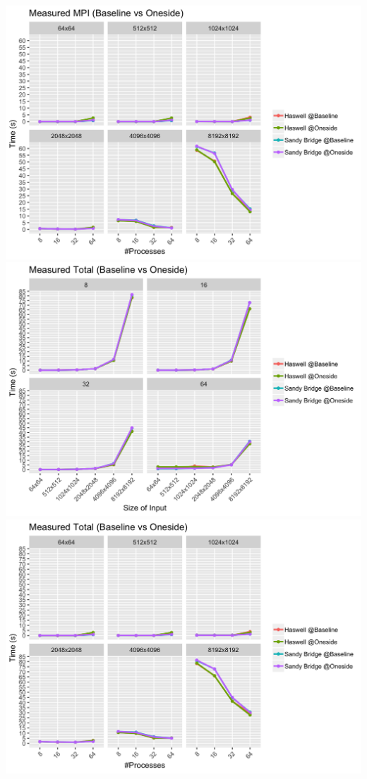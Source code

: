 \documentclass[10pt, letterpaper, twoside]{article}
\begin{document}
\begin{titlepage}
\begin{enumerate}
\includegraphics[scale = 0.18]{OSBaseline_Measured-MPI_InputSize.png}
\vspace{10mm}
\includegraphics[scale = 0.18]{OSBaseline_Measured-Total_Processes.png}
\includegraphics[scale = 0.18]{OSBaseline_Measured-Total_InputSize.png}


\end{enumerate}
\end{titlepage}
\end{document}
